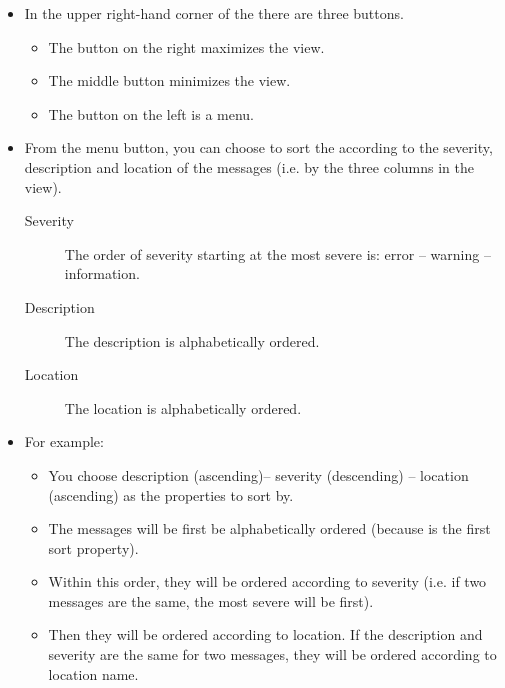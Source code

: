 % 
%
%

\begin{itemize}
\item In the upper right-hand corner of the \gdprobview{} there are three buttons.
\begin{itemize}
\item The button on the right maximizes the view.
\item The middle button minimizes the view.
\item The button on the left is a menu.
\end{itemize}
\item From the menu button, you can choose to sort the \gdprobview{} according to the severity, description and location of the messages (i.e. by the three columns in the view).
\begin{description}
\item[Severity]{The order of severity starting at the most severe  is: error -- warning --information.}
\item [Description]{The description is alphabetically ordered.}
\item [Location]{The location is alphabetically ordered.}
\end{description}
 \item For example:
 \begin{itemize}
 \item You choose description (ascending)-- severity (descending) -- location (ascending) as the  properties to sort by.
 \item The messages will be first be alphabetically ordered (because  is the first sort property).
 \item Within this order, they will be ordered according to severity (i.e. if two messages are the same, the most severe will be first).
 \item Then they will be ordered according to location. If the description and severity are the same for two messages, they will be ordered according to location name. 
 \end{itemize}
\end{itemize}
